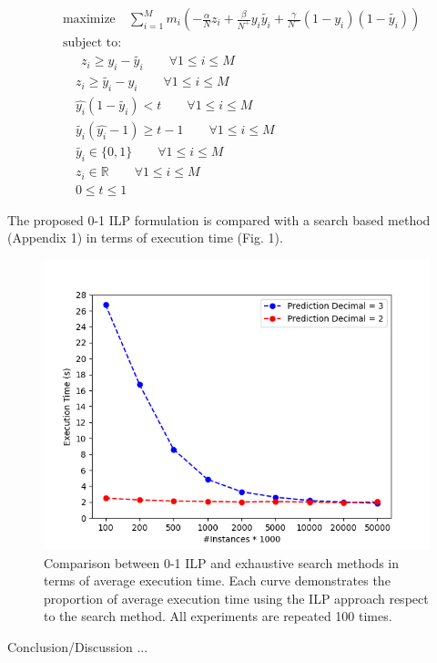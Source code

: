 \documentclass[a4paper, twocolumn]{article}
\begin{document}
\begin{equation}
\label{improved_ilp}
\begin{aligned}
&\text{maximize} \quad \sum_{i=1}^{M} m_i(-\frac{\alpha}{N}z_i + \frac{\beta}{N^+} y_i \tilde{y_i} + \frac{\gamma}{N^-} (1-y_i) (1-\tilde{y_i}))\\
&\text{subject to:}\\
&\quad \: \: z_i \ge y_i - \tilde{y_i} \qquad \forall 1\le i \le M \qquad\\
& \quad z_i \ge \tilde{y_i}  - y_i \qquad \forall 1\le i \le M \qquad\\
& \quad \hat{y_i} (1 - \tilde{y_i}) < t \qquad \forall 1\le i \le M \qquad\\
& \quad  \tilde{y_i} (\hat{y_i} - 1) \ge t - 1 \qquad \forall 1\le i \le M \qquad\\
& \quad \tilde{y_i} \in \{0, 1\} \qquad \forall 1\le i \le M \\
& \quad z_i \in \mathbb{R} \qquad \forall 1\le i \le M \\
& \quad  0 \le t \le 1
\end{aligned}
\end{equation}

The proposed 0-1 ILP formulation is compared with a search based method (Appendix 1) in terms of execution time (Fig. 1).
\begin{figure}[t]
	\includegraphics[width=\columnwidth]{figure_4_temp}
	\caption{Comparison between 0-1 ILP and exhaustive search methods in terms of average execution time. Each curve demonstrates the proportion of average execution time using the ILP approach respect to the search method. All experiments are repeated 100 times.}
\end{figure}

Conclusion/Discussion ...

\printbibliography
\end{document}
